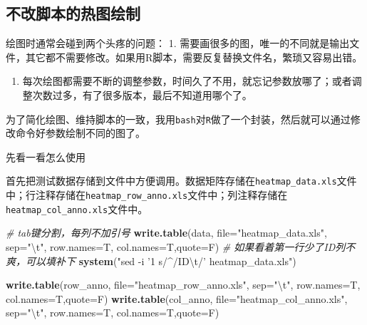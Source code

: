 \documentclass[]{article}
\newenvironment{Shaded}{\begin{snugshade}}{\end{snugshade}}
\newcommand{\KeywordTok}[1]{\textcolor[rgb]{0.13,0.29,0.53}{\textbf{{#1}}}}
\newcommand{\DataTypeTok}[1]{\textcolor[rgb]{0.13,0.29,0.53}{{#1}}}
\newcommand{\CharTok}[1]{\textcolor[rgb]{0.31,0.60,0.02}{{#1}}}
\newcommand{\StringTok}[1]{\textcolor[rgb]{0.31,0.60,0.02}{{#1}}}
\newcommand{\CommentTok}[1]{\textcolor[rgb]{0.56,0.35,0.01}{\textit{{#1}}}}
\newcommand{\NormalTok}[1]{{#1}}
\providecommand{\tightlist}{%
  \setlength{\itemsep}{0pt}\setlength{\parskip}{0pt}}
\numberwithin{figure}{section}
\numberwithin{table}{section}
\theoremstyle{definition}
\theoremstyle{definition}
\theoremstyle{definition}
\theoremstyle{remark}
\begin{document}
\subsection{不改脚本的热图绘制}

绘图时通常会碰到两个头疼的问题： 1.
需要画很多的图，唯一的不同就是输出文件，其它都不需要修改。如果用R脚本，需要反复替换文件名，繁琐又容易出错。

\begin{enumerate}
\def\labelenumi{\arabic{enumi}.}
\setcounter{enumi}{1}
\tightlist
\item
  每次绘图都需要不断的调整参数，时间久了不用，就忘记参数放哪了；或者调整次数过多，有了很多版本，最后不知道用哪个了。
\end{enumerate}

为了简化绘图、维持脚本的一致，我用\texttt{bash}对\texttt{R}做了一个封装，然后就可以通过修改命令好参数绘制不同的图了。

先看一看怎么使用

首先把测试数据存储到文件中方便调用。数据矩阵存储在\texttt{heatmap\_data.xls}文件中；行注释存储在\texttt{heatmap\_row\_anno.xls}文件中；列注释存储在\texttt{heatmap\_col\_anno.xls}文件中。

\begin{Shaded}
\begin{Highlighting}[]
\CommentTok{# tab键分割，每列不加引号}
\KeywordTok{write.table}\NormalTok{(data, }\DataTypeTok{file=}\StringTok{"heatmap_data.xls"}\NormalTok{, }\DataTypeTok{sep=}\StringTok{"}\CharTok{\textbackslash{}t}\StringTok{"}\NormalTok{, }\DataTypeTok{row.names=}\NormalTok{T, }\DataTypeTok{col.names=}\NormalTok{T,}\DataTypeTok{quote=}\NormalTok{F)}
\CommentTok{# 如果看着第一行少了ID列不爽，可以填补下}
\KeywordTok{system}\NormalTok{(}\StringTok{"sed -i '1 s/^/ID}\CharTok{\textbackslash{}t}\StringTok{/' heatmap_data.xls"}\NormalTok{)}

\KeywordTok{write.table}\NormalTok{(row_anno, }\DataTypeTok{file=}\StringTok{"heatmap_row_anno.xls"}\NormalTok{, }\DataTypeTok{sep=}\StringTok{"}\CharTok{\textbackslash{}t}\StringTok{"}\NormalTok{, }\DataTypeTok{row.names=}\NormalTok{T, }
        \DataTypeTok{col.names=}\NormalTok{T,}\DataTypeTok{quote=}\NormalTok{F)}
\KeywordTok{write.table}\NormalTok{(col_anno, }\DataTypeTok{file=}\StringTok{"heatmap_col_anno.xls"}\NormalTok{, }\DataTypeTok{sep=}\StringTok{"}\CharTok{\textbackslash{}t}\StringTok{"}\NormalTok{, }\DataTypeTok{row.names=}\NormalTok{T, }
        \DataTypeTok{col.names=}\NormalTok{T,}\DataTypeTok{quote=}\NormalTok{F)}
\end{Highlighting}
\end{Shaded}
\end{document}
